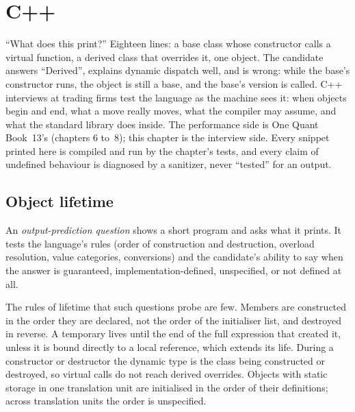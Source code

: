 \chapter{C++}\label{ch:iv:cpp}

``What does this print?'' Eighteen lines: a base class whose constructor calls a virtual function, a derived class that
overrides it, one object. The candidate answers ``Derived'', explains dynamic dispatch well, and is wrong: while the base's
constructor runs, the object is still a base, and the base's version is called. C++ interviews at trading firms test the
language as the machine sees it: when objects begin and end, what a move really moves, what the compiler may assume, and
what the standard library does inside. The performance side is One Quant Book~13's (chapters 6 to~8); this chapter is the
interview side. Every snippet printed here is compiled and run by the chapter's tests, and every claim of undefined behaviour
is diagnosed by a sanitizer, never ``tested'' for an output.

\section{Object lifetime}

\begin{definition}\label{def:iv:cpp:output}
An \emph{output-prediction question} shows a short program and asks what it prints. It
tests the language's rules (order of construction and destruction, overload resolution, value categories, conversions)
and the candidate's ability to say when the answer is guaranteed, implementation-defined, unspecified, or not defined at all.
\end{definition}

The rules of lifetime that such questions probe are few. Members are constructed in the order they are declared, not the
order of the initialiser list, and destroyed in reverse. A temporary lives until the end of the full expression that created
it, unless it is bound directly to a local reference, which extends its life. During a constructor or destructor the dynamic
type is the class being constructed or destroyed, so virtual calls do not reach derived overrides. Objects with static storage
in one translation unit are initialised in the order of their definitions; across translation units the order is unspecified.

